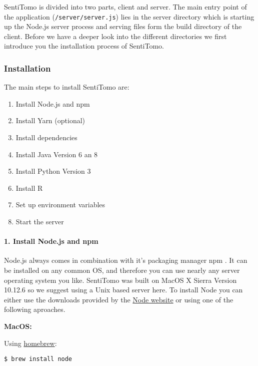 \documentclass[]{article}
\providecommand{\tightlist}{%
  \setlength{\itemsep}{0pt}\setlength{\parskip}{0pt}}
\let\oldparagraph\paragraph
\renewcommand{\paragraph}[1]{\oldparagraph{#1}\mbox{}}
\begin{document}
\begin{verbatim}

\end{verbatim}

SentiTomo is divided into two parts, client and server. The main entry
point of the application (\texttt{/server/server.js}) lies in the server
directory which is starting up the Node.js server process and serving
files form the build directory of the client. Before we have a deeper
look into the different directories we first introduce you the
installation process of SentiTomo.

\subsubsection{Installation}\label{installation}

The main steps to install SentiTomo are:

\begin{enumerate}
\tightlist
\item
  Install Node.js and npm
\item
  Install Yarn (optional)
\item
  Install dependencies
\item
  Install Java Version 6 an 8
\item
  Install Python Version 3
\item
  Install R
\item
  Set up environment variables
\item
  Start the server
\end{enumerate}

\paragraph{1. Install Node.js and npm}\label{install-node.js-and-npm}

Node.js always comes in combination with it's packaging manager npm . It
can be installed on any common OS, and therefore you can use nearly any
server operating system you like. SentiTomo was built on MacOS X Sierra
Version 10.12.6 so we suggest using a Unix based server here. To install
Node you can either use the downloads provided by the
\href{https://nodejs.org/en/download/}{Node website} or using one of the
following aproaches.

\textbf{MacOS:}

Using \href{https://brew.sh/}{homebrew}:

\begin{verbatim}
$ brew install node
\end{verbatim}
\end{document}
